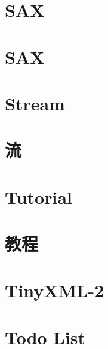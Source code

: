 \documentclass[twoside]{book}
\newcommand{\+}{\discretionary{\mbox{\scriptsize$\hookleftarrow$}}{}{}}
\begin{document}
\chapter{S\+AX}
\label{md_Cadriciel_Commun_Externe_RapidJSON_doc_sax}
\hypertarget{md_Cadriciel_Commun_Externe_RapidJSON_doc_sax}{}

\chapter{S\+AX}
\label{md_Cadriciel_Commun_Externe_RapidJSON_doc_sax.zh-cn}
\hypertarget{md_Cadriciel_Commun_Externe_RapidJSON_doc_sax.zh-cn}{}

\chapter{Stream}
\label{md_Cadriciel_Commun_Externe_RapidJSON_doc_stream}
\hypertarget{md_Cadriciel_Commun_Externe_RapidJSON_doc_stream}{}

\chapter{流}
\label{md_Cadriciel_Commun_Externe_RapidJSON_doc_stream.zh-cn}
\hypertarget{md_Cadriciel_Commun_Externe_RapidJSON_doc_stream.zh-cn}{}

\chapter{Tutorial}
\label{md_Cadriciel_Commun_Externe_RapidJSON_doc_tutorial}
\hypertarget{md_Cadriciel_Commun_Externe_RapidJSON_doc_tutorial}{}

\chapter{教程}
\label{md_Cadriciel_Commun_Externe_RapidJSON_doc_tutorial.zh-cn}
\hypertarget{md_Cadriciel_Commun_Externe_RapidJSON_doc_tutorial.zh-cn}{}

\chapter{Tiny\+X\+M\+L-\/2}
\label{md_Cadriciel_Commun_Externe_tinyxml2_readme}
\hypertarget{md_Cadriciel_Commun_Externe_tinyxml2_readme}{}

\chapter{Todo List}
\label{todo}
\hypertarget{todo}{}

\end{document}
